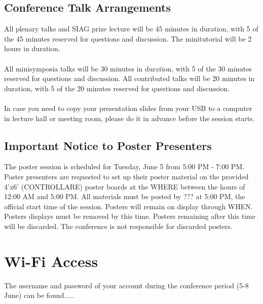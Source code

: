 \documentclass[10pt, a4paper]{book}
\begin{document}
\begin{multicols}{2}
\subsection*{Conference Talk Arrangements}
All plenary talks and SIAG prize lecture will be 45 minutes in duration,
with 5 of the 45 minutes reserved for questions and discussion.
The minitutorial will be 2 hours in duration.\\\\
All minisymposia talks will be 30 minutes in duration, with 5 of the 30
minutes reserved for questions and discussion.
All contributed talks will be 20 minutes in duration, with 5 of the 20
minutes reserved for questions and discussion.\\\\
In case you need to copy your presentation slides from your USB to a
computer in lecture hall or meeting room, please do it in advance before
the session starts.
\subsection*{Important Notice to Poster Presenters}
The poster session is scheduled for
Tuesday, June 5 from 5:00 PM - 7:00 PM. Poster
presenters are requested to set up
their poster material on the provided
4'x6' (CONTROLLARE) poster boards at the WHERE between the hours of 12:00 AM and 5:00 PM. 
All materials must
be posted by ??? at
5:00 PM, the official start time of
the session. Posters will remain on display through WHEN.
Posters displays must be removed by this time. Posters remaining after this time will be discarded.
The conference is not responsible for
discarded posters.
\section*{Wi-Fi Access}
The username and password of your account during the conference period (5-8 June) can be found.....

\end{multicols}
\end{document}
